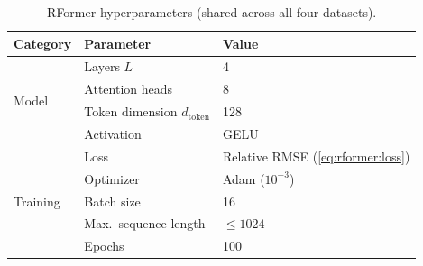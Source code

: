 \begin{table}[t]
  \centering
  \caption{RFormer hyperparameters (shared across all four datasets).}
  \label{tab:rformer:hyperparameters}
  \begin{tabular}{lll}
    \toprule
    Category & Parameter & Value \\
    \midrule
    \multirow{4}{*}{Model}
      & Layers $L$ & 4 \\
      & Attention heads & 8 \\
      & Token dimension $d_{\mathrm{token}}$ & 128 \\
      & Activation & GELU \\
    \midrule
    \multirow{5}{*}{Training}
      & Loss & Relative RMSE (\cref{eq:rformer:loss}) \\
      & Optimizer & Adam ($10^{-3}$) \\
      & Batch size & 16 \\
      & Max.\ sequence length & $\leq 1024$ \\
      & Epochs & 100 \\
    \bottomrule
  \end{tabular}
\end{table}
